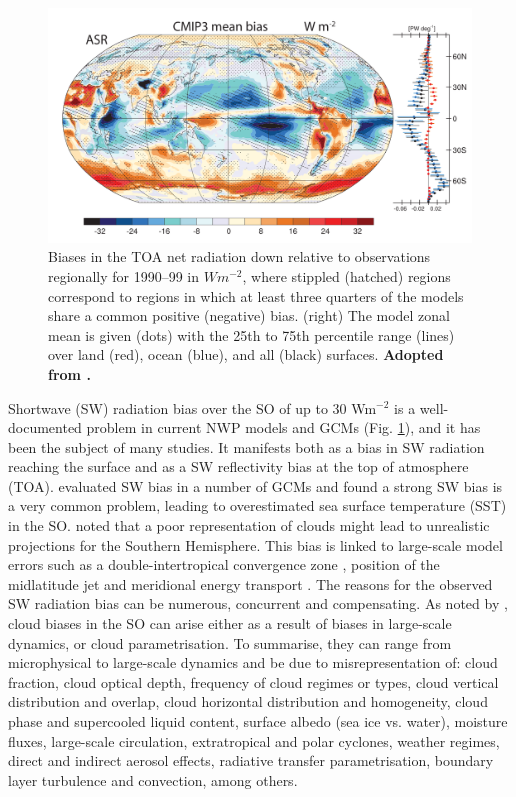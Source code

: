 \begin{figure}[t]
\centering
\includegraphics[width=\textwidth]{fig/trenberth-fassulo-sw-bias.png}
\caption[Biases in the TOA net radiation down]{
Biases in the TOA net radiation down relative to observations regionally for
1990--99
in $Wm^{-2}$, where stippled (hatched) regions correspond to regions
in which at least three quarters of the models share a common
positive (negative) bias. (right) The model zonal mean is given
(dots) with the 25th to 75th percentile range (lines) over land (red),
ocean (blue), and all (black) surfaces. \textbf{Adopted from
\cite{trenberth2010}.}
}
\label{fig:trenberth-fassulo-sw-bias}
\end{figure}

Shortwave (SW) radiation bias over the SO of up to 30 Wm$^{-2}$ is a
well-documented problem in current NWP models and GCMs
\citep{trenberth2010} (Fig. \ref{fig:trenberth-fassulo-sw-bias}),
and it has been the subject of many studies.
It manifests both as a bias in SW radiation reaching the surface and as a
SW reflectivity bias at the top of atmosphere (TOA).
\cite{bodas-salcedo2014} evaluated SW bias in a number
of GCMs and found a strong SW bias is a very common problem, leading to
overestimated sea surface temperature (SST) in the SO.
\cite{trenberth2010} noted that a poor representation of clouds might lead to
unrealistic projections for the Southern Hemisphere. This bias is linked to
large-scale model errors such as a double-intertropical
convergence zone \citep{hwang2013}, position of the midlatitude jet and
meridional energy transport \citep{mason2014}.
The reasons for the observed SW radiation bias
can be numerous, concurrent and compensating.
As noted by \cite{kelleher2019}, cloud biases in the SO can arise either
as a result of biases in large-scale dynamics, or cloud parametrisation.
To summarise, they can range
from microphysical to large-scale dynamics and be due to misrepresentation of:
cloud fraction, cloud optical depth, frequency of cloud regimes or types,
cloud vertical distribution and overlap, cloud horizontal distribution
and homogeneity, cloud phase and supercooled liquid content, surface albedo
(sea ice vs. water), moisture fluxes, large-scale circulation, extratropical
and polar cyclones, weather regimes, direct and indirect aerosol effects,
radiative transfer parametrisation, boundary layer turbulence and convection,
among others.

